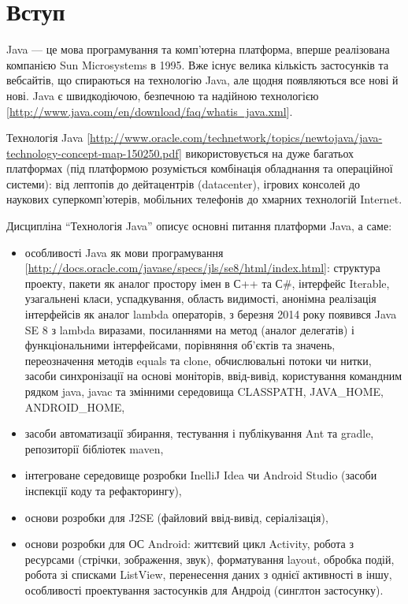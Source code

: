 \section*{Вступ}
Java --- це мова програмування та комп'ютерна платформа, вперше  реалізована компанією Sun Microsystems в 1995. Вже існує велика кількість застосунків та вебсайтів, що спираються на технологію Java, але щодня появляються все нові й нові. Java є швидкодіючою, безпечною та надійною технологією [\url{http://www.java.com/en/download/faq/whatis_java.xml}]. 

Технологія Java [\url{http://www.oracle.com/technetwork/topics/newtojava/java-technology-concept-map-150250.pdf}] використовується на дуже багатьох платформах (під платформою розуміється комбінація обладнання та операційної системи):
від лептопів до дейтацентрів (datacenter), ігрових консолей до наукових суперкомп'ютерів, мобільних телефонів до хмарних технологій Internet.

Дисципліна ``Технологія Java'' описує основні питання платформи Java, а саме:
\begin{itemize}
\item особливості Java як мови програмування [\url{http://docs.oracle.com/javase/specs/jls/se8/html/index.html}]: структура проекту, пакети як аналог простору імен в С++ та С\#, інтерфейс Iterable, узагальнені класи, успадкування, область видимості, анонімна реалізація інтерфейсів як аналог lambda операторів, з березня 2014 року появився Java SE 8 з lambda виразами, посиланнями на метод (аналог делегатів) і функціональними інтерфейсами,  порівняння об'єктів та значень, переозначення методів equals та clone, обчислювальні потоки чи нитки, засоби синхронізації на основі моніторів, ввід-вивід, користування командним рядком java, javac та змінними середовища CLASSPATH, JAVA\_HOME, ANDROID\_HOME,
\item засоби автоматизації збирання, тестування і публікування Ant та gradle, репозиторії бібліотек maven,
\item інтегроване середовище розробки InelliJ Idea чи Android Studio (засоби інспекції коду та рефакторингу),
\item основи розробки для J2SE (файловий ввід-вивід, серіалізація),
\item основи розробки для ОС Android: життєвий цикл Activity, робота з ресурсами (стрічки, зображення, звук), форматування layout, обробка подій, робота зі списками ListView, перенесення даних з однієї активності в іншу, особливості проектування застосунків для Андроід (синглтон застосунку).
\end{itemize}


